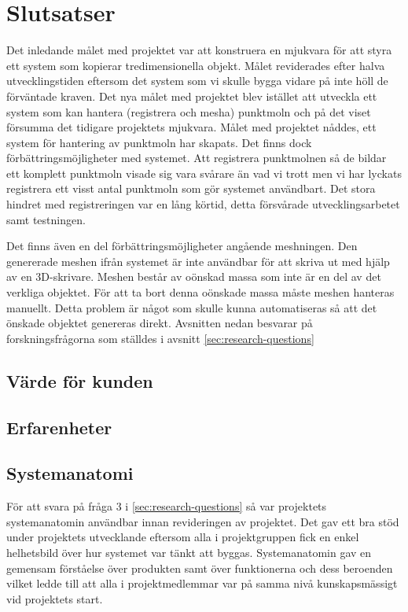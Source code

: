 \chapter{Slutsatser}
\label{cha:conclusion}
Det inledande målet med projektet var att konstruera en mjukvara för att styra ett system som kopierar tredimensionella objekt. Målet reviderades efter halva utvecklingstiden eftersom det system som vi skulle bygga vidare på inte höll de förväntade kraven. Det nya målet med projektet blev istället att utveckla ett system som kan hantera (registrera och mesha) punktmoln och på det viset försumma det tidigare projektets mjukvara. Målet med projektet nåddes, ett system för hantering av punktmoln har skapats. Det finns dock förbättringsmöjligheter med systemet. Att registrera punktmolnen så de bildar ett komplett punktmoln visade sig vara svårare än vad vi trott men vi har lyckats registrera ett visst antal punktmoln som gör systemet användbart. Det stora hindret med registreringen var en lång körtid, detta försvårade utvecklingsarbetet samt testningen. 

Det finns även en del förbättringsmöjligheter angående meshningen. Den genererade meshen ifrån systemet är inte användbar för att skriva ut med hjälp av en 3D-skrivare. Meshen består av oönskad massa som inte är en del av det verkliga objektet. För att ta bort denna oönskade massa måste meshen hanteras manuellt. Detta problem är något som skulle kunna automatiseras så att det önskade objektet genereras direkt. Avsnitten nedan besvarar på forskningsfrågorna som ställdes i avsnitt \ref{sec:research-questions}

\section{Värde för kunden}
\section{Erfarenheter}
\section{Systemanatomi}
För att svara på fråga 3 i \ref{sec:research-questions} så var projektets systemanatomin användbar innan revideringen av projektet. Det gav ett bra stöd under projektets utvecklande eftersom alla i projektgruppen fick en enkel helhetsbild över hur systemet var tänkt att byggas. Systemanatomin gav en gemensam förståelse över produkten samt över funktionerna och dess beroenden vilket ledde till att alla i projektmedlemmar var på samma nivå kunskapsmässigt vid projektets start.

